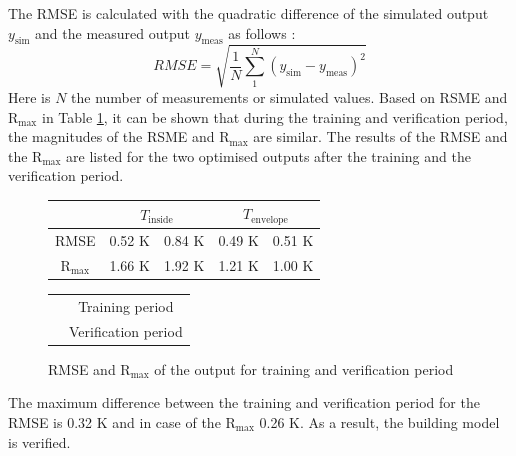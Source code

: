     The RMSE is calculated with the quadratic difference of the simulated output $y_\text{sim}$ and the measured output $y_\text {meas}$ as follows \cite{Barnston.1992}: 
    \begin{equation}
        RMSE = \sqrt{\frac{1}{N} \sum \limits_1^N (y_\text{sim} - y_\text {meas})^2}
    \end{equation}
    Here is $N$ the number of measurements or simulated values.
    Based on RSME and $\mathrm{R}_\text{max}$ in Table \ref{tab:RMSEundR}, it can be shown that during the training and verification period, the magnitudes of the RSME and $\mathrm{R}_\text{max}$ are similar. The results of the RMSE and the $\mathrm{R}_\text{max}$ are listed for the two optimised outputs after the training and the verification period.
     \begin{figure}[h]
    \begin{minipage}[t]{0.5\textwidth}
    \vspace{0pt}
        \begin{tabular}{c|c|c|c|c}
             & \multicolumn{2}{|c}{$T_\text{inside}$} & \multicolumn{2}{|c}{$T_\text{envelope}$} \\
             \hline
            RMSE & \cellcolor{gray} 0.52 K & \cellcolor{gray90} 0.84 K & \cellcolor{gray} 0.49 K & \cellcolor{gray90} 0.51 K \\
            $\mathrm{R}_\text{max}$ &\cellcolor{gray} 1.66 K & \cellcolor{gray90} 1.92 K & \cellcolor{gray} 1.21 K & \cellcolor{gray90} 1.00 K
        \end{tabular}
    \end{minipage}
    \hfill
    \begin{minipage}[t]{0.5\textwidth}
    \vspace{0pt}
        \begin{tabular}{c c}
        \\
            &\cellcolor{gray} Training period \\
           &\cellcolor{gray90} Verification period
        \end{tabular}
    \end{minipage}
    \caption{RMSE and $\mathrm{R}_\text{max}$ of the output for training and verification period}
    \label{tab:RMSEundR}
    \end{figure}
    The maximum difference between the training and verification period for the RMSE is 0.32 K and in case of the $\mathrm{R}_\text{max}$ 0.26 K. As a result, the building model is verified. \newline

